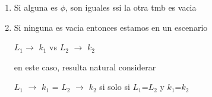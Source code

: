 \documentclass{article}
\begin{document}
            \begin{enumerate}
                \item Si alguna es $\phi$, son iguales ssi la otra tmb es vacia
                \item Si ninguna es vacia entonces estamos en un escenario 
                \begin{center}
                    $L_{1}$$\rightarrow$ $k_{1}$ vs $L_{2}$ $\rightarrow$ $k_{2}$
                \end{center}
                en este caso, resulta natural considerar 
                \begin{center}
                    $L_{1}$ $\rightarrow$ $k_{1}$ = $L_{2}$ $\rightarrow$ $k_{2}$ si solo si $L_{1}$=$L_{2}$ y $k_{1}$=$k_{2}$
                \end{center}
            \end{enumerate}
\end{document}
